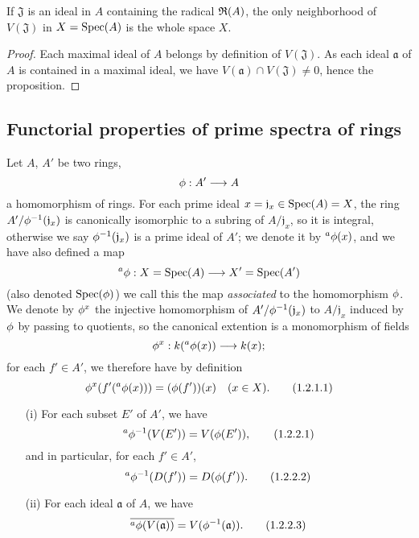 \begin{prop}[1.1.15]
\label{prop-1.1.1.15}
If $\mathfrak{J}$ is an ideal in $A$ containing the radical $\mathfrak{R}(A)$, the only
neighborhood of $V(\mathfrak{J})$ in $X={\mathop{\mathrm{Spec}}\nolimits}(A)$ is the whole space $X$.
\end{prop}

\begin{proof}
\label{proof-prop-1.1.1.15}
Each maximal ideal of $A$ belongs by definition of $V(\mathfrak{J})$.
As each ideal $\mathfrak{a}$ of $A$ is contained in a maximal ideal, we have
$V(\mathfrak{a})\cap V(\mathfrak{J})\neq 0$, hence the proposition.
\end{proof}

\subsection{Functorial properties of prime spectra of rings}
\label{subsection-func-prop}

\begin{env}[1.2.1]
\label{env-1.1.2.1}
Let $A$, $A'$ be two rings,
\[
  \phi:A'\longrightarrow A
\]
a homomorphism of rings. For each prime ideal $x=\mathfrak{j}_x\in{\mathop{\mathrm{Spec}}\nolimits}(A)=X$, the
ring $A'/\phi^{-1}(\mathfrak{j}_x)$ is canonically isomorphic to a subring of
$A/\mathfrak{j}_x$, so it is integral, otherwise we say
$\phi^{-1}(\mathfrak{j}_x)$ is a prime ideal of $A'$; we denote it by
${}^a\phi(x)$, and we have also defined a map
\[
  {}^a\phi:X={\mathop{\mathrm{Spec}}\nolimits}(A)\longrightarrow X'={\mathop{\mathrm{Spec}}\nolimits}(A')
\]
(also denoted ${\mathop{\mathrm{Spec}}\nolimits}(\phi)$) we call this the map {\em associated} to the
homomorphism $\phi$. We denote by $\phi^x$ the injective homomorphism of
$A'/\phi^{-1}(\mathfrak{j}_x)$ to $A/\mathfrak{j}_x$ induced by $\phi$ by
passing to quotients, so the canonical extention is a monomorphism of fields
\[
  \phi^x:k({}^a\phi(x))\longrightarrow k(x);
\]
for each $f'\in A'$, we therefore have by definition
\[
  \phi^x(f'({}^a\phi(x)))=(\phi(f'))(x)\quad(x\in X).
  \tag{1.2.1.1}
\]
\end{env}

\begin{prop}[1.2.2]
\label{prop-1.1.2.2}
\medskip\noindent
\begin{itemize}
  \item[{\rm(i)}] For each subset $E'$ of $A'$, we have
    \[
      {}^a\phi^{-1}(V(E'))=V(\phi(E')),
      \tag{1.2.2.1}
    \]
    and in particular, for each $f'\in A'$,
    \[
      {}^a\phi^{-1}(D(f'))=D(\phi(f')).
      \tag{1.2.2.2}
    \]
  \item[{\rm(ii)}] For each ideal $\mathfrak{a}$ of $A$, we have
    \[
      \overline{{}^a\phi(V(\mathfrak{a}))}=V(\phi^{-1}(\mathfrak{a})).
      \tag{1.2.2.3}
    \]
\end{itemize}
\end{prop}

